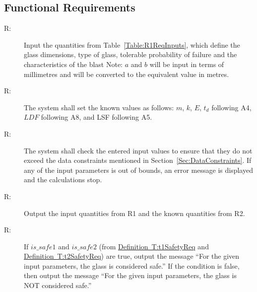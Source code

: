 \documentclass[12pt]{article}
\newcounter{reqnum}
\newcommand{\rthereqnum}{R\thereqnum}
\begin{document}
\subsection{Functional Requirements}
\label{Sec:FRs}
\begin{description}
\item[\rthereqnum\label{FR:s7.1.req1}:]Input the quantities from Table~\ref{Table:R1ReqInputs}, which define the glass dimensions, type of glass, tolerable probability of failure and the characteristics of the blast Note: $a$ and $b$ will be input in terms of millimetres and will be converted to the equivalent value in metres.
\end{description}
\begin{description}
\item[\rthereqnum\label{FR:s7.1.req2}:]The system shall set the known values as follows: $m$, $k$, $E$, ${t_{d}}$ following A4, $LDF$ following A8, and LSF following A5.
\end{description}
\begin{description}
\item[\rthereqnum\label{FR:s7.1.req3}:]The system shall check the entered input values to ensure that they do not exceed the data constraints mentioned in Section~\ref{Sec:DataConstraints}. If any of the input parameters is out of bounds, an error message is displayed and the calculations stop.
\end{description}
\begin{description}
\item[\rthereqnum\label{FR:s7.1.req4}:]Output the input quantities from R1 and the known quantities from R2.
\end{description}
\begin{description}
\item[\rthereqnum\label{FR:s7.1.req5}:]If $is\_safe1$ and $is\_safe2$ (from \hyperref[T:t1SafetyReq]{Definition~T:t1SafetyReq} and \hyperref[T:t2SafetyReq]{Definition~T:t2SafetyReq}) are true, output the message ``For the given input parameters, the glass is considered safe.'' If the condition is false, then output the message ``For the given input parameters, the glass is NOT considered safe.''
\end{description}
\end{document}
